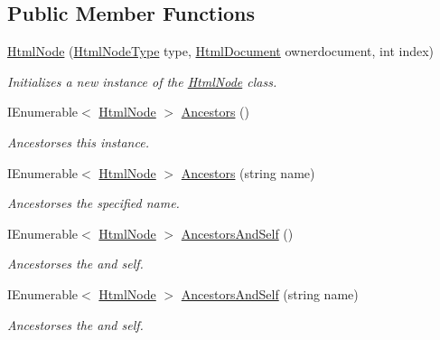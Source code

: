 \subsection*{Public Member Functions}
\begin{DoxyCompactItemize}
\item 
\hyperlink{class_html_agility_pack_1_1_html_node_a45c77e9a164bfe301f5aa587baa790e0}{Html\+Node} (\hyperlink{namespace_html_agility_pack_a0f81457339b5330e8cf9abe5a6123171}{Html\+Node\+Type} type, \hyperlink{class_html_agility_pack_1_1_html_document}{Html\+Document} ownerdocument, int index)
\begin{DoxyCompactList}\small\item\em Initializes a new instance of the \hyperlink{class_html_agility_pack_1_1_html_node}{Html\+Node} class. \end{DoxyCompactList}\item 
I\+Enumerable$<$ \hyperlink{class_html_agility_pack_1_1_html_node}{Html\+Node} $>$ \hyperlink{class_html_agility_pack_1_1_html_node_ac7d604337aaefbb6dc9727c34a75fb40}{Ancestors} ()
\begin{DoxyCompactList}\small\item\em Ancestorses this instance. \end{DoxyCompactList}\item 
I\+Enumerable$<$ \hyperlink{class_html_agility_pack_1_1_html_node}{Html\+Node} $>$ \hyperlink{class_html_agility_pack_1_1_html_node_a00e1743acf98dffbdc7c0231f1e80028}{Ancestors} (string name)
\begin{DoxyCompactList}\small\item\em Ancestorses the specified name. \end{DoxyCompactList}\item 
I\+Enumerable$<$ \hyperlink{class_html_agility_pack_1_1_html_node}{Html\+Node} $>$ \hyperlink{class_html_agility_pack_1_1_html_node_aa344c3c6ea4ef0a752f4129ba22c23fc}{Ancestors\+And\+Self} ()
\begin{DoxyCompactList}\small\item\em Ancestorses the and self. \end{DoxyCompactList}\item 
I\+Enumerable$<$ \hyperlink{class_html_agility_pack_1_1_html_node}{Html\+Node} $>$ \hyperlink{class_html_agility_pack_1_1_html_node_a674b0a3eb47a448295668c859495c297}{Ancestors\+And\+Self} (string name)
\begin{DoxyCompactList}\small\item\em Ancestorses the and self. \end{DoxyCompactList}\item 

\end{DoxyCompactItemize}
